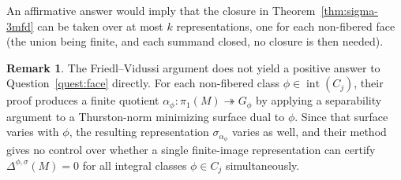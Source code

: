 \documentclass[11pt]{amsart}
\theoremstyle{definition}
\newtheorem{remark}[theorem]{Remark}
\DeclareMathOperator{\inter}{{int}}
\newcommand{\surj}{\twoheadrightarrow}
\begin{document}
An affirmative answer would imply that the closure in Theorem~\ref{thm:sigma-3mfd} 
can be taken over at most $k$ representations, one for each non-fibered face 
(the union being finite, and each summand closed, no closure is then needed).

\begin{remark}
\label{rem:FV-nonfibered}
The Friedl--Vidussi argument does not yield a positive answer to 
Question~\ref{quest:face} directly.  For each non-fibered class 
$\phi \in \inter(C_j)$, their proof produces a finite 
quotient $\alpha_\phi \colon \pi_1(M) \surj G_\phi$ 
by applying a separability argument to a Thurston-norm minimizing 
surface dual to $\phi$.  Since that surface varies with $\phi$, 
the resulting representation $\sigma_{\alpha_\phi}$ varies as well, 
and their method gives no control over whether a single finite-image 
representation can certify $\Delta^{\phi,\sigma}(M)=0$ for all 
integral classes $\phi \in C_j$ simultaneously.
\end{remark}


\newcommand{\arxiv}[1]
{\texttt{\href{http://arxiv.org/abs/#1}{arXiv:#1}}}
\newcommand{\arx}[1]
{\texttt{\href{http://arxiv.org/abs/#1}{arXiv:}}
\texttt{\href{http://arxiv.org/abs/#1}{#1}}}
\newcommand{\doi}[1]
{\texttt{\href{http://dx.doi.org/#1}{doi:#1}}}
\renewcommand{\MR}[1]
{\href{http://www.ams.org/mathscinet-getitem?mr=#1}{MR#1}}
\end{document}
